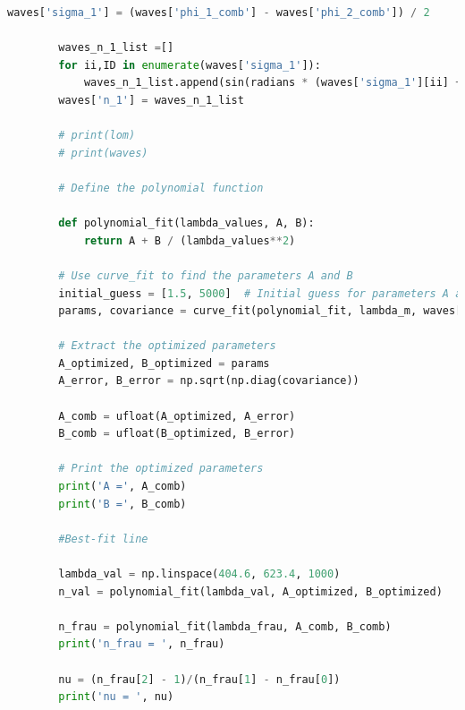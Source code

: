 \documentclass[a4paper,11pt]{article}
\begin{document}
\begin{lstlisting}[language=Python, basicstyle=\tiny, breaklines=true]
        waves['sigma_1'] = (waves['phi_1_comb'] - waves['phi_2_comb']) / 2

        waves_n_1_list =[]
        for ii,ID in enumerate(waves['sigma_1']):
            waves_n_1_list.append(sin(radians * (waves['sigma_1'][ii] + omega_mean)/2)/sin(radians * omega_mean/2))
        waves['n_1'] = waves_n_1_list 
        
        # print(lom)
        # print(waves)

        # Define the polynomial function
        
        def polynomial_fit(lambda_values, A, B):
            return A + B / (lambda_values**2)
        
        # Use curve_fit to find the parameters A and B
        initial_guess = [1.5, 5000]  # Initial guess for parameters A and B
        params, covariance = curve_fit(polynomial_fit, lambda_m, waves['n_1'].apply(lambda x: x.nominal_value), p0=initial_guess)
        
        # Extract the optimized parameters
        A_optimized, B_optimized = params
        A_error, B_error = np.sqrt(np.diag(covariance))
        
        A_comb = ufloat(A_optimized, A_error)
        B_comb = ufloat(B_optimized, B_error)
        
        # Print the optimized parameters
        print('A =', A_comb)
        print('B =', B_comb)
        
        #Best-fit line
        
        lambda_val = np.linspace(404.6, 623.4, 1000)
        n_val = polynomial_fit(lambda_val, A_optimized, B_optimized)

        n_frau = polynomial_fit(lambda_frau, A_comb, B_comb)
        print('n_frau = ', n_frau)
        
        nu = (n_frau[2] - 1)/(n_frau[1] - n_frau[0])
        print('nu = ', nu)
    \end{lstlisting} 
\end{document}
